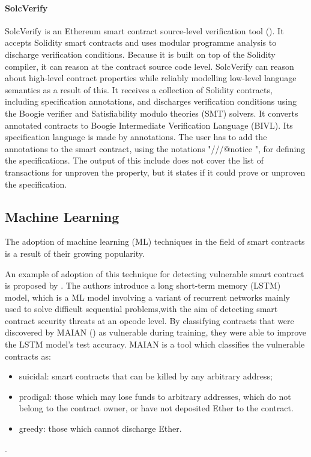 \documentclass[a4paper,sigconf, language=french,
language=german, language=spanish, language=english]{acmart}
\begin{document}
\paragraph{SolcVerify} 
SolcVerify is an Ethereum smart contract source-level verification tool (\cite{SolcVerify}).
It accepts Solidity smart contracts and uses modular programme analysis to discharge verification conditions.
Because it is built on top of the Solidity compiler, it can reason at the contract source code level.
SolcVerify can reason about high-level contract properties while reliably modelling low-level language semantics as a result of this.
It receives a collection of Solidity contracts, including specification annotations, and discharges verification conditions using the Boogie verifier and Satisfiability modulo theories (SMT) solvers.
It converts annotated contracts to Boogie Intermediate Verification Language (BIVL). 
Its specification language is made by annotations. The user has to add the annotations to the smart contract, using the notations "///@notice ", for defining the specifications.
The output of this include does not cover the list of transactions for unproven the property, but it states if it could prove or unproven the specification.

\subsection{Machine Learning}
The adoption of machine learning (ML) techniques in the field of smart contracts is a result of their growing popularity. 

An example of adoption of this technique for detecting vulnerable smart contract is proposed by \citet{MLAnalysis}.
The authors introduce a long short-term memory (LSTM) model, which is a ML model involving a variant of recurrent networks mainly used to solve difficult sequential problems,with the aim of detecting smart
contract security threats at an opcode level. 
By classifying contracts that were discovered by MAIAN (\cite{MAIAN}) as vulnerable during training, they were able to improve the LSTM model's test accuracy. MAIAN is a tool which classifies the vulnerable contracts as:
\begin{itemize}
    \item suicidal:  smart contracts that can be killed by any arbitrary address; 
    \item prodigal: those which may lose funds to arbitrary addresses, which do not belong to the contract owner, or have not deposited Ether to the contract.
    \item greedy: those which cannot discharge Ether. 
\end{itemize} .
\end{document}
